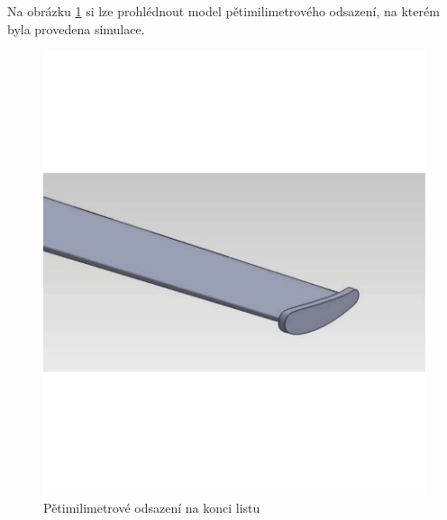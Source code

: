 Na obrázku \ref{konec:1} si lze prohlédnout model pětimilimetrového odsazení, na kterém byla provedena simulace.
\begin{figure}[H]
	\centering
	\includegraphics[]{obrazky/simulace/konec1p}
	\caption{Pětimilimetrové odsazení na konci listu}
	\label{konec:1}
\end{figure}

